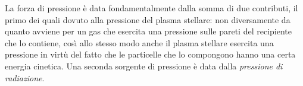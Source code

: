 La forza di pressione è data fondamentalmente dalla somma di due contributi, il primo dei quali dovuto alla pressione del plasma stellare: non diversamente da quanto avviene per un gas che esercita una pressione sulle pareti del recipiente che lo contiene, cos\`{\i}{} allo stesso modo anche il plasma stellare esercita una pressione in virtù del fatto che  le particelle che lo compongono hanno una certa energia cinetica.
Una seconda sorgente di pressione è data dalla \emph{pressione di radiazione}.%
